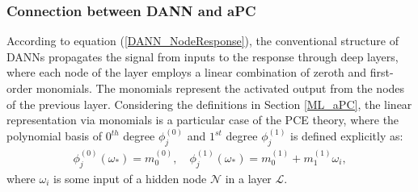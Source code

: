 \documentclass[a4paper,fleqn]{article}
\newcommand{\rw}[1]{\textcolor{blue}{#1}}
\renewcommand{\rw}[1]{#1}
\begin{document}
\subsubsection{Connection between DANN and aPC}
\label{DANNmonomials}
According to equation (\ref{DANN_NodeResponse}), the conventional structure of DANNs propagates the signal from inputs to the response through deep layers, where each node of the layer employs a linear combination of \rw{zeroth and first-order} monomials. The monomials represent the activated output from the nodes of the previous layer. Considering the definitions in Section \ref{ML_aPC}, the linear representation via monomials is a particular case of the PCE theory, where the polynomial basis of $0^{th}$ degree $\phi^{(0)}_j$ and $1^{st}$ degree $\phi^{(1)}_j$ is defined explicitly as:
%
\begin{eqnarray}
\label{poly_linear_monomials}
\phi^{(0)}_j(\omega_*) = m^{(0)}_0, \quad \phi^{(1)}_j(\omega_*) = m^{(1)}_0+m^{(1)}_1 \omega_i,
\end{eqnarray}
where $\omega_i$ is some input of a hidden node $\mathcal{N}$ in a layer $\mathcal{L}$. 
\end{document}
